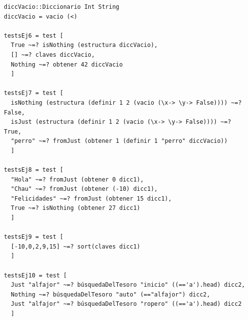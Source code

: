 \documentclass[a4paper]{article}
\begin{document}
\begin{verbatim}
diccVacio::Diccionario Int String
diccVacio = vacio (<)

testsEj6 = test [
  True ~=? isNothing (estructura diccVacio),
  [] ~=? claves diccVacio,
  Nothing ~=? obtener 42 diccVacio
  ]

testsEj7 = test [
  isNothing (estructura (definir 1 2 (vacio (\x-> \y-> False)))) ~=? False,
  isJust (estructura (definir 1 2 (vacio (\x-> \y-> False)))) ~=? True,
  "perro" ~=? fromJust (obtener 1 (definir 1 "perro" diccVacio))
  ]

testsEj8 = test [
  "Hola" ~=? fromJust (obtener 0 dicc1),
  "Chau" ~=? fromJust (obtener (-10) dicc1),
  "Felicidades" ~=? fromJust (obtener 15 dicc1),
  True ~=? isNothing (obtener 27 dicc1)
  ]

testsEj9 = test [
  [-10,0,2,9,15] ~=? sort(claves dicc1)
  ]

testsEj10 = test [
  Just "alfajor" ~=? búsquedaDelTesoro "inicio" ((=='a').head) dicc2,
  Nothing ~=? búsquedaDelTesoro "auto" (=="alfajor") dicc2,
  Just "alfajor" ~=? búsquedaDelTesoro "ropero" ((=='a').head) dicc2
  ]
\end{verbatim}
\end{document}
